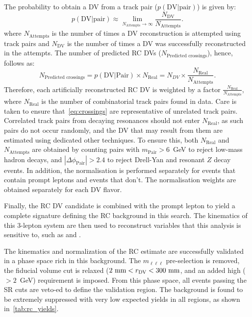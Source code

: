 The probability to obtain a DV from a track pair ($p(\text{DV|pair})$) is given by:
\begin{equation}
    p(\text{DV|pair}) \approx \lim_{N_\text{Attempts}\to \infty}\frac{N_\text{DV}}{N_\text{Attempts}}.
\end{equation}
where $N_\text{Attempts}$ is the number of times a DV reconstruction is attempted using track pairs and $N_\text{DV}$ is the number of times a DV was successfully reconstructed in the attempts. The number of predicted RC DVs ($N_\text{Predicted crossings}$), hence, follows as:
\begin{equation}\label{eq:crossings}
    N_\text{Predicted crossings} = p(\text{DV}|\text{Pair}) \times N_\text{Real} = N_{DV} \times \frac{N_\text{Real}}{N_\text{Attempts}}.
\end{equation}
Therefore, each artificially reconstructed RC DV is weighted by a factor $\frac{N_\text{Real}}{N_\text{Attempts}}$, where $N_\text{Real}$ is the number of combinatorial track pairs found in data. Care is taken to ensure that~\cref{eq:crossings} are representative of unrelated track pairs. Correlated track pairs from decaying resonances should not enter $N_\mathrm{Real}$, as such pairs do not occur randomly, and the DV that may result from them are estimated using dedicated other techniques. To ensure this, both $N_\mathrm{Real}$ and $N_\mathrm{Attempts}$ are obtained by counting pairs with $m_\mathrm{Pair}>6$~GeV to reject low-mass hadron decays, and $|\Delta\phi_\mathrm{Pair}|>2.4$ to reject Drell-Yan and resonant $Z$ decay events. In addition, the normalisation is performed separately for events that contain prompt leptons and events that don’t. The normalisation weights are obtained separately for each DV flavor.

Finally, the RC DV candidate is combined with the prompt lepton to yield a complete signature defining the RC background in this search. The kinematics of this 3-lepton system are then used to reconstruct variables that this analysis is sensitive to, such as \mdv and \mhnl.

The kinematics and normalization of the RC estimate are successfully validated in a phase space rich in this background. The $m_{\ell\ell\ell}$ pre-selection is removed, the fiducial volume cut is relaxed ($2\text{ mm}<r_{\mathrm{DV}}<300\text{ mm}$, and an added high \mdv ($>2$~GeV) requirement is imposed. From this phase space, all events passing the SR cuts are veto-ed to define the validation region. The background is found to be extremely suppressed with very low expected yields in all regions, as shown in~\cref{tab:rc_yields}. 

